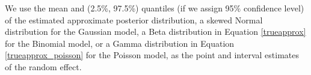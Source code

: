 \documentclass[article]{jss}
\begin{document}
We use the  mean and (2.5\%, 97.5\%) quantiles (if we assign 95\% confidence level) of the estimated approximate posterior distribution, a skewed Normal distribution for the Gaussian model, a Beta distribution in Equation \ref{trueapprox} for the Binomial model, or a Gamma distribution in Equation \ref{trueapprox_poisson} for the Poisson model, as the point and interval estimates of the random effect.










\end{document}
